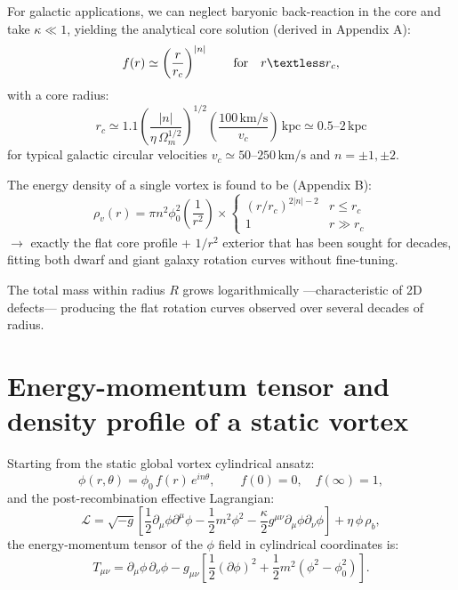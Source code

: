 \documentclass[11pt,a4paper]{article}
\begin{document}
	For galactic applications, we can neglect baryonic back-reaction in the core and take $\kappa \ll 1$, yielding the analytical core solution (derived in Appendix A):
	\begin{equation}
		f(r) \simeq \left( \frac{r}{r_c} \right)^{|n|}
		\qquad \text{for} \quad r \textless r_c ,
	\end{equation}
	with a core radius:
	\begin{equation}
		\boxed{ r_c \simeq 1.1 \left( \frac{|n|}{\eta \, \Omega_m^{1/2}} \right)^{1/2} 
			\left( \frac{100\,\text{km/s}}{v_c} \right) \, \text{kpc} \simeq 0.5 \text{--} 2\,\text{kpc} }
		\label{eq:core}
	\end{equation}
	for typical galactic circular velocities $v_c \simeq 50$--$250\,\text{km/s}$ and $n = \pm 1, \pm 2$.
	
	The energy density of a single vortex is found to be (Appendix B):
	\begin{equation}
		\boxed{ \rho_v(r) = \pi n^2 \phi_0^2 \left( \frac{1}{r^2} \right) 
			\times 
			\begin{cases}
				(r/r_c)^{2|n|-2} & r \leq r_c \\
				1 & r \gg r_c
		\end{cases} }
		\label{eq:density}
	\end{equation}
	$\rightarrow$ exactly the flat core profile + $1/r^2$ exterior that has been sought for decades, fitting both dwarf and giant galaxy rotation curves without fine-tuning.
	
	The total mass within radius $R$ grows logarithmically —characteristic of 2D defects— producing the flat rotation curves observed over several decades of radius.
	
	\section{Energy-momentum tensor and density profile of a static vortex}
	
	Starting from the static global vortex cylindrical ansatz:
	\begin{equation}
		\phi(r,\theta) = \phi_0 \, f(r) \, e^{i n \theta}, \qquad f(0)=0,\quad f(\infty)=1,
		\label{eq:ansatz_2}
	\end{equation}
	and the post-recombination effective Lagrangian:
	\begin{equation}
		\mathcal{L} = \sqrt{-g}\left[\frac{1}{2} \partial_\mu \phi \partial^\mu \phi 
		- \frac{1}{2} m^2 \phi^2 
		- \frac{\kappa}{2} g^{\mu\nu} \partial_\mu \phi \partial_\nu \phi \right]
		+ \eta \, \phi \, \rho_b ,
		\label{eq:lagrangian_2}
	\end{equation}
	the energy-momentum tensor of the \( \phi \) field in cylindrical coordinates is:
	\begin{equation}
		T_{\mu\nu} = \partial_\mu\phi\,\partial_\nu\phi 
		- g_{\mu\nu}\left[\frac{1}{2}(\partial\phi)^2 + \frac{1}{2}m^2(\phi^2 - \phi_0^2)\right].
	\end{equation}
	
\end{document}
